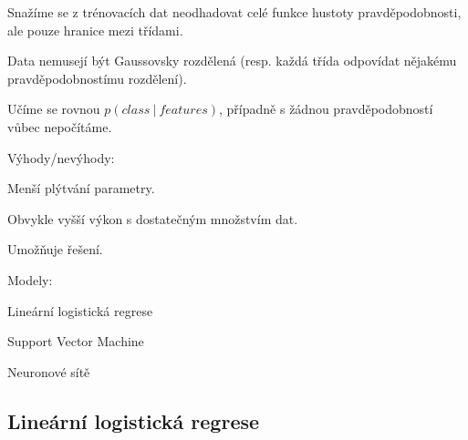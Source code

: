 \begin{compactitem}
    \item Snažíme se z trénovacích dat neodhadovat celé funkce hustoty pravděpodobnosti, ale pouze hranice mezi třídami.

    \item Data nemusejí být Gaussovsky rozdělená (resp. každá třída odpovídat nějakému pravděpodobnostímu rozdělení).

    \item Učíme se rovnou $p(class ~|~ features)$, případně s žádnou pravděpodobností vůbec nepočítáme.

    \item Výhody/nevýhody: \begin{compactitem}
        \item Menší plýtvání parametry.
        \item Obvykle vyšší výkon s dostatečným množstvím dat.
        \item Umožňuje  řešení.
    \end{compactitem}

    \item Modely: \begin{compactitem}
        \item Lineární logistická regrese
        \item Support Vector Machine
        \item Neuronové sítě
    \end{compactitem}
\end{compactitem}

\subsection{Lineární logistická regrese}

